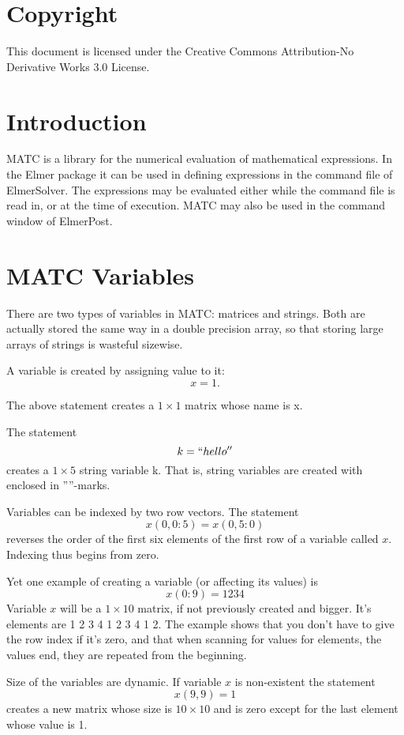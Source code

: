\section*{Copyright}

This document is licensed under the Creative Commons Attribution-No Derivative Works 3.0 License. 


\section{Introduction}
MATC is a library for the numerical evaluation of mathematical expressions. In the Elmer 
package it can be used in defining expressions in the command file of ElmerSolver. The expressions
may be evaluated either while the command file is read in, or at the time of execution.
MATC may also be used in the command window of ElmerPost.   


\section{MATC Variables}

There are two types of variables in MATC: matrices and strings. 
Both are actually stored the same way in a double precision array, so that storing large arrays of strings is wasteful sizewise. 

A variable is created by assigning value to it: 
\[
  x = 1. 
\]
 
The above statement creates a $1 \times 1$ matrix whose name is x. 

The statement 
\[
  k = ``hello''
\]
 creates a $1 \times 5$ string variable k. That is, string variables are created with enclosed in ''''-marks. 

Variables can be indexed by two row vectors. The statement 
\[
   x(0,0:5) = x(0,5:0)
\]
reverses the order of the first six elements of the first row of a variable called $x$. 
Indexing thus begins from zero. 

Yet one example of creating a variable (or affecting its values) is 
\[
  x(0:9) = 1 2 3 4
\]
 Variable $x$ will be a $1 \times 10$ matrix, if not previously created and bigger. 
It's elements are 1 2 3 4 1 2 3 4 1 2.
The example shows that you don't have to give the row index if it's zero, and that when scanning for values for elements, the values end, they are repeated from the beginning. 

Size of the variables are dynamic. If variable $x$ is non-existent the statement 
\[
  x(9,9) = 1
\]
creates a new matrix whose size is $10 \times 10$ and is zero except for the last element whose value is 1. 

